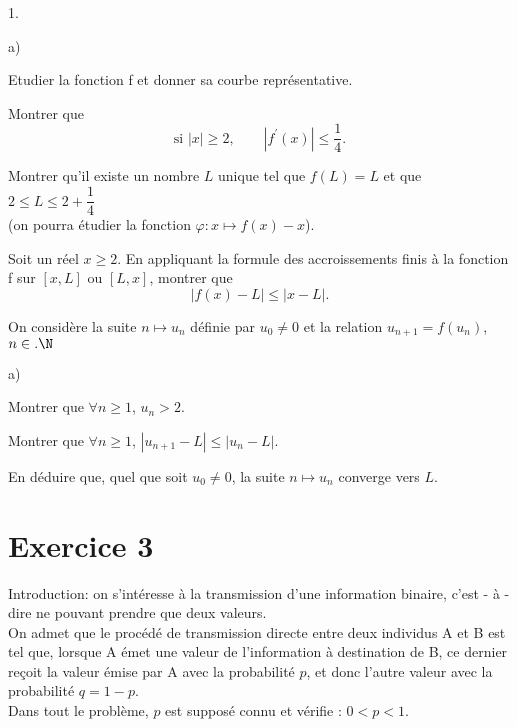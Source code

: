 \documentclass[11pt]{article}%
\begin{document}
\begin{noliste}{1.}
 \setlength{\itemsep}{4mm}
\item 

\begin{noliste}{a)}
 \setlength{\itemsep}{2mm}
\item Etudier la fonction f et donner sa courbe représentative.

\item Montrer que 
\[
\text{si }\left| x\right| \geq 2,\qquad |f^{\prime
}(x)|\leq \dfrac{1}{4}.
\]
\end{noliste}

\item Montrer qu'il existe un nombre $L$ unique tel que $f(L) = L$ et
que $2\leq L\leq 2 + \dfrac{1}{4}$\\
(on pourra étudier la fonction $\varphi :x\mapsto f(x) - x$).

\item Soit un réel $x\geq 2$. En appliquant la formule des
accroissements finis à la fonction f sur $[x,L]$ ou $[L,x]$, montrer
que 
\[
\left| f(x) - L\right| \leq \left| x - L\right|.
\]

\item On considère la suite $n\mapsto u_{n}$ définie par $u_{0}\neq 0$
et la
relation $u_{n + 1} = f(u_{n})$, $n\in.\N$

\begin{noliste}{a)}
 \setlength{\itemsep}{2mm}
\item Montrer que $\forall n\geq 1$, $u_{n}>2$.

\item Montrer que $\forall n\geq 1$, $\left| u_{n + 1} - L\right|
\leq \left| u_{n} - L\right| $.

\item En déduire que, quel que soit $u_{0}\neq 0$, la suite $n\mapsto
u_{n}$
converge vers $L$.
\end{noliste}
\end{noliste}

\section*{Exercice 3}

Introduction: on s'intéresse à la transmission d'une information
binaire,
c'est - à - dire ne pouvant prendre que deux valeurs.\\
On admet que le procédé de transmission directe entre deux individus A
et B
est tel que, lorsque A émet une valeur de l'information à destination
de B,
ce dernier reçoit la valeur émise par A avec la probabilité $p$, et
donc
l'autre valeur avec la probabilité $q = 1 - p$.\\
Dans tout le problème, $p$ est supposé connu et vérifie : $0<p<1$.
\end{document}
